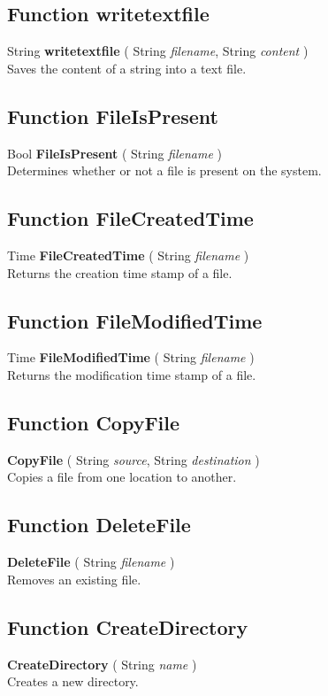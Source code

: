 \subsection{Function writetextfile \label{F:writetextfile}}
String \textbf{writetextfile} ( String \textit{filename}, String \textit{content} ) \\
Saves the content of a string into a text file.

\subsection{Function FileIsPresent \label{F:FileIsPresent}}
Bool \textbf{FileIsPresent} ( String \textit{filename} ) \\
Determines whether or not a file is present on the system.

\subsection{Function FileCreatedTime \label{F:FileCreatedTime}}
Time \textbf{FileCreatedTime} ( String \textit{filename} ) \\
Returns the creation time stamp of a file.

\subsection{Function FileModifiedTime \label{F:FileModifiedTime}}
Time \textbf{FileModifiedTime} ( String \textit{filename} ) \\
Returns the modification time stamp of a file.

\subsection{Function CopyFile \label{F:CopyFile}}
\textbf{CopyFile} ( String \textit{source}, String \textit{destination} ) \\
Copies a file from one location to another.

\subsection{Function DeleteFile \label{F:DeleteFile}}
\textbf{DeleteFile} ( String \textit{filename} ) \\
Removes an existing file.

\subsection{Function CreateDirectory \label{F:CreateDirectory}}
\textbf{CreateDirectory} ( String \textit{name} ) \\
Creates a new directory.

